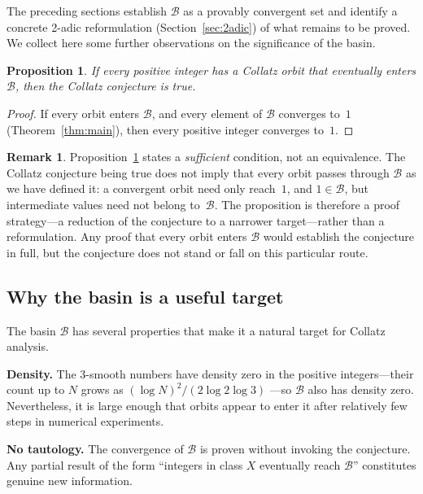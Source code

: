 \documentclass[12pt]{amsart}
\newtheorem{proposition}[theorem]{Proposition}
\theoremstyle{definition}
\newtheorem{remark}[theorem]{Remark}
\newcommand{\basin}{\mathcal{B}}
\begin{document}
The preceding sections establish $\basin$ as a provably convergent set and
identify a concrete 2-adic reformulation (Section~\ref{sec:2adic}) of what
remains to be proved.  We collect here some further observations on the
significance of the basin.

\begin{proposition}\label{prop:sufficient}
  If every positive integer has a Collatz orbit that eventually enters
  $\basin$, then the Collatz conjecture is true.
\end{proposition}

\begin{proof}
  If every orbit enters $\basin$, and every element of $\basin$ converges
  to~$1$ (Theorem~\ref{thm:main}), then every positive integer converges
  to~$1$.
\end{proof}

\begin{remark}
  Proposition~\ref{prop:sufficient} states a \emph{sufficient} condition,
  not an equivalence.  The Collatz conjecture being true does not imply that
  every orbit passes through $\basin$ as we have defined it: a convergent
  orbit need only reach~$1$, and $1 \in \basin$, but intermediate values
  need not belong to~$\basin$.  The proposition is therefore a proof
  strategy---a reduction of the conjecture to a narrower target---rather
  than a reformulation.  Any proof that every orbit enters $\basin$ would
  establish the conjecture in full, but the conjecture does not stand or
  fall on this particular route.
\end{remark}

\subsection*{Why the basin is a useful target}

The basin $\basin$ has several properties that make it a natural target for
Collatz analysis.

\textbf{Density.}
The 3-smooth numbers have density zero in the positive integers---their
count up to $N$ grows as $(\log N)^2 / (2 \log 2 \log 3)$
\cite{Lehmer1964}---so $\basin$ also has density zero.  Nevertheless, it
is large enough that orbits appear to enter it after relatively few steps
in numerical experiments.

\textbf{No tautology.}
The convergence of $\basin$ is proven without invoking the conjecture.
Any partial result of the form ``integers in class $X$ eventually reach
$\basin$'' constitutes genuine new information.
\end{document}
